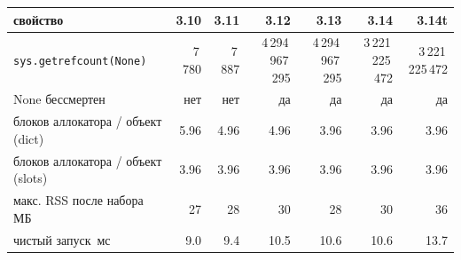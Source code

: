 \begin{tabular}{lrrrrrr}
\toprule
свойство & 3.10 & 3.11 & 3.12 & 3.13 & 3.14 & 3.14t \\
\midrule
\texttt{sys.getrefcount(None)} & 7\,780 & 7\,887 & 4\,294\,967\,295 & 4\,294\,967\,295 & 3\,221\,225\,472 & 3\,221\,225\,472 \\
None бессмертен & нет & нет & да & да & да & да \\
блоков аллокатора / объект (dict) & 5.96 & 4.96 & 4.96 & 3.96 & 3.96 & 3.96 \\
блоков аллокатора / объект (slots) & 3.96 & 3.96 & 3.96 & 3.96 & 3.96 & 3.96 \\
макс. RSS после набора\, МБ & 27 & 28 & 30 & 28 & 30 & 36 \\
чистый запуск\, мс & 9.0 & 9.4 & 10.5 & 10.6 & 10.6 & 13.7 \\
\bottomrule
\end{tabular}
